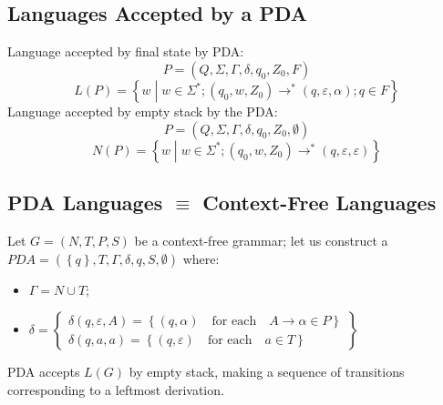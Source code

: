 \subsection{Languages Accepted by a PDA}
Language accepted by final state by PDA:
$$
    P = (Q, \Sigma, \Gamma, \delta, q_0, Z_0, F)
$$
$$
    L(P) = \left\{w \middle| w \in \Sigma^\ast; (q_0, w, Z_0) \to^\ast (q, \varepsilon, \alpha); q \in F \right\}
$$
Language accepted by empty stack by the PDA:
$$
    P = (Q, \Sigma, \Gamma, \delta, q_0, Z_0, \emptyset)
$$
$$
    N(P) = \left\{w \middle| w \in \Sigma^\ast; (q_0, w, Z_0) \to^\ast (q, \varepsilon, \varepsilon) \right\}
$$

\subsection{PDA Languages $\equiv$ Context-Free Languages}
Let $G = (N, T, P, S)$ be a context-free grammar; let us construct a $PDA = (\left\{q\right\}, T, \Gamma, \delta, q, S, \emptyset)$ where:
\begin{itemize}
    \item $\Gamma = N \cup T$;
    \item $\delta = \begin{Bmatrix}
        \delta(q, \varepsilon, A) = \left\{(q, \alpha) \quad \text{for each} \quad A \to \alpha \in P \right\} \\
        \delta(q, a, a) = \left\{(q, \varepsilon) \quad \text{for each} \quad a \in T \right\}
        \end{Bmatrix}$
\end{itemize}
PDA accepts $L(G)$ by empty stack, making a sequence of transitions corresponding to a leftmost derivation.